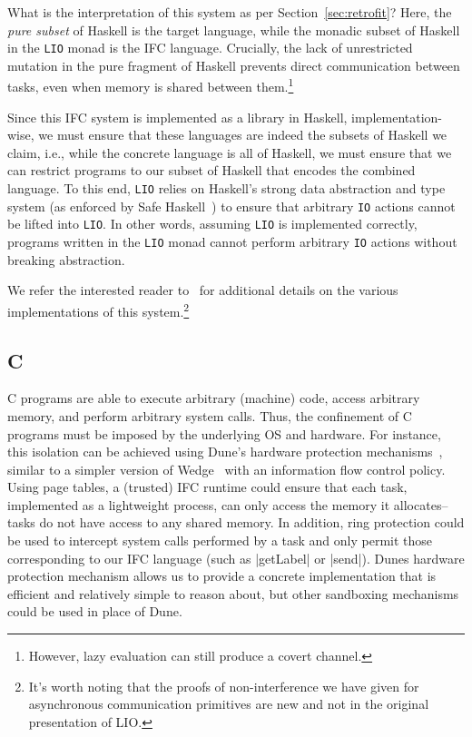 What is the interpretation of this system as per Section~\ref{sec:retrofit}?
%
Here, the \emph{pure subset} of Haskell is the target language, while
the monadic subset of Haskell in the \verb|LIO| monad is the IFC
language.
%
Crucially, the lack of unrestricted mutation in the pure fragment of
Haskell prevents direct communication between tasks, even when memory is
shared between them.\footnote{However, lazy evaluation can still produce
a covert channel.}

Since this IFC system is implemented as a library in Haskell,
implementation-wise, we must ensure that these languages are indeed the subsets of Haskell
we claim, i.e., while the concrete language is all of Haskell, we must
ensure that we can restrict programs to our subset of Haskell that
encodes the combined language.
%
To this end, \verb|LIO| relies on Haskell's strong data abstraction and type system
(as enforced by Safe Haskell~\cite{Terei:2012:SH:2364506.2364524}) to
ensure that arbitrary \verb|IO| actions cannot be lifted into
\verb|LIO|.
%
In other words, assuming \verb|LIO| is implemented correctly, programs
written in the \verb|LIO| monad cannot perform arbitrary \verb|IO| actions
without breaking abstraction.

We refer the interested reader to~\cite{lio,stefan:addressing-covert} for
additional details on the various implementations of this system.\footnote{It's worth noting that the proofs of non-interference we have given for asynchronous communication primitives are new and not in the original presentation of LIO.}


\subsection{C}
\label{sec:real:c}
%
C programs are able to execute arbitrary (machine) code, access
arbitrary memory, and perform arbitrary system calls.
%
Thus, the confinement of C programs must be imposed by the underlying OS
and hardware.
%
For instance, this isolation can be achieved using Dune's hardware protection
mechanisms~\cite{Belay:2012:DSU:2387880.2387913}, similar to a simpler
version of Wedge~\cite{Belay:2012:DSU:2387880.2387913,
Bittau:2008:WSA:1387589.1387611} with an information flow control
policy.
%
Using page tables, a (trusted) IFC runtime could ensure that each task,
implemented as a lightweight process, can only access the memory it
allocates--tasks do not have access to any shared memory.
%
In addition, ring protection could be used to intercept system
calls performed by
a task and only permit those corresponding to our IFC language (such as
|getLabel| or |send|).
%
Dunes hardware protection mechanism allows us to provide a concrete
implementation that is efficient and relatively simple to reason
about, but other sandboxing mechanisms could be used in place of Dune.

